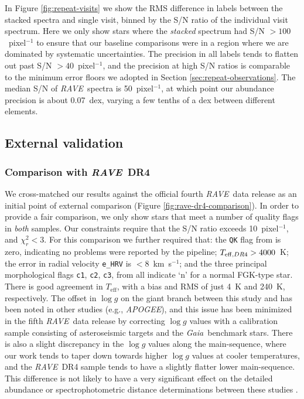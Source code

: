 \documentclass[preprint]{aastex}
\newcommand{\acronym}[1]{{\small{#1}}}
\newcommand{\project}[1]{\textsl{#1}}
\newcommand{\gaia}{\project{Gaia}}
\newcommand{\rave}{\project{\acronym{RAVE}}}
\newcommand{\apogee}{\project{\acronym{APOGEE}}}
\newcommand{\teff}{T_{\mathrm{eff}}}
\newcommand{\logg}{\log g}
\begin{document}
In Figure \ref{fig:repeat-visits} we show the RMS difference
in labels between the stacked spectra and single visit, binned by the
S/N ratio of the individual visit spectrum.  Here we only show stars
where the \emph{stacked} spectrum had S/N $>100$~pixel$^{-1}$ to ensure
that our baseline comparisons were in a region where we are dominated
by systematic uncertainties.  The precision in all labels tends to
flatten out past S/N $> 40$~pixel$^{-1}$, and the precision at high S/N
ratios is comparable to the minimum error floors we adopted in Section
\ref{sec:repeat-observations}.  The median S/N of \rave\ spectra is
50~pixel$^{-1}$, at which point our abundance precision is about 
0.07~dex, varying a few tenths of a dex between different elements.


\subsection{External validation}
\label{sec:external-validation}

\subsubsection{Comparison with \rave\ DR4}
\label{sec:validation-kordopatis}

We cross-matched our results against the official fourth \rave\ data release 
as an initial point of external comparison (Figure \ref{fig:rave-dr4-comparison}).
In order to provide a fair comparison, we only show stars that meet a number
of quality flags in \emph{both} samples.  Our constraints require that the
S/N ratio exceeds 10~pixel$^{-1}$, and $\chi_r^2 < 3$.  For this comparison
we further required that:
the \texttt{QK} flag from \citet{Kordopatis_2013} is zero, indicating no
problems were reported by the pipeline; $T_{{\rm eff},DR4} > 4000$~K;
the error in radial velocity \texttt{e\_HRV} is $<$8~km~s$^{-1}$; and the three
principal morphological flags \texttt{c1}, \texttt{c2}, \texttt{c3}, from 
\citet{Matijevic_2012} all indicate `n' for a normal FGK-type star.
There is good agreement in $\teff$, with a bias and RMS of just 4~K and 240~K,
respectively. The offset in $\logg$ on the giant branch between this study and 
\citet{Kordopatis_2013} has been noted in other studies (e.g., \apogee), and this issue
has been minimized in the fifth \rave\ data release by correcting $\logg$
values with a calibration sample consisting of asteroseismic targets and the
\gaia\ benchmark stars.  There is also a
slight discrepancy in the $\logg$ values along the main-sequence, where our
work tends to taper down towards higher $\logg$ values at cooler temperatures,
and the \rave\ DR4 sample tends to have a slightly flatter lower main-sequence.
This difference is not likely to have a very significant effect on the detailed
abundance or spectrophotometric distance determinations between these studies 
\citep{Binney_2014}.
\end{document}
